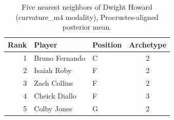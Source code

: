 \begin{table}[htbp]
  \centering\small
  \begin{tabular}{rllc}
    \toprule
    Rank & Player & Position & Archetype \\
    \midrule
    1 & Bruno Fernando & C & 2 \\
    2 & Isaiah Roby & F & 2 \\
    3 & Zach Collins & F & 2 \\
    4 & Cheick Diallo & F & 3 \\
    5 & Colby Jones & G & 2 \\
    \bottomrule
  \end{tabular}
  \caption{Five nearest neighbors of Dwight Howard (curvature_m4 modality), Procrustes-aligned posterior mean.}
  \label{tab:Dwight_Howard_neighbors_curvature_m4}
\end{table}


